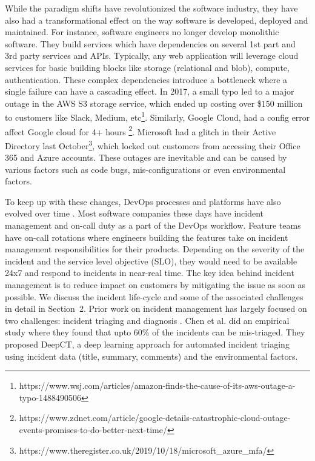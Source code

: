 While the paradigm shifts have revolutionized the software industry, they have also had a transformational effect on the way software is developed, deployed and maintained. For instance, software engineers no longer develop monolithic software. They build services which have dependencies on several 1st part and 3rd party services and APIs. Typically, any web application will leverage cloud services for basic building blocks like storage (relational and blob), compute, authentication. These complex dependencies introduce a bottleneck where a single failure can have a cascading effect. In 2017, a small typo led to a major outage in the AWS S3 storage service, which ended up costing over \$$150$ million to customers like Slack, Medium, etc\footnote{https://www.wsj.com/articles/amazon-finds-the-cause-of-its-aws-outage-a-typo-1488490506}. Similarly, Google Cloud, had a config error affect Google cloud for 4+ hours \footnote{https://www.zdnet.com/article/google-details-catastrophic-cloud-outage-events-promises-to-do-better-next-time/}. Microsoft had a glitch in their Active Directory last October\footnote{https://www.theregister.co.uk/2019/10/18/microsoft\_azure\_mfa/}, which locked out customers from accessing their Office 365 and Azure accounts. These outages are inevitable and can be caused by various factors such as code bugs, mis-configurations \cite{mehta2020rex} or even environmental factors.

To keep up with these changes, DevOps processes and platforms have also evolved over time \cite{lipredicting, dang2019aiops, kumar2019building}. Most software companies these days have incident management and on-call duty as a part of the DevOps workflow. Feature teams have on-call rotations where engineers building the features take on incident management responsibilities for their products. Depending on the severity of the incident and the service level objective (SLO), they would need to be available 24x7 and respond to incidents in near-real time. The key idea behind incident management is to reduce impact on customers by mitigating the issue as soon as possible. We discuss the incident life-cycle and some of the associated challenges in detail in Section~2. Prior work on incident management has largely focused on two challenges: incident triaging \cite{ContinuousTriageASE2019, EmpiricalIcMICSE2019} and diagnosis \cite{nair2015learning, bansal2019decaf, luo2014correlating}. Chen et al. \cite{ContinuousTriageASE2019} did an empirical study where they found that upto 60\% of the incidents can be mis-triaged. They proposed DeepCT, a deep learning approach for automated incident triaging using incident data (title, summary, comments) and the environmental factors. 

